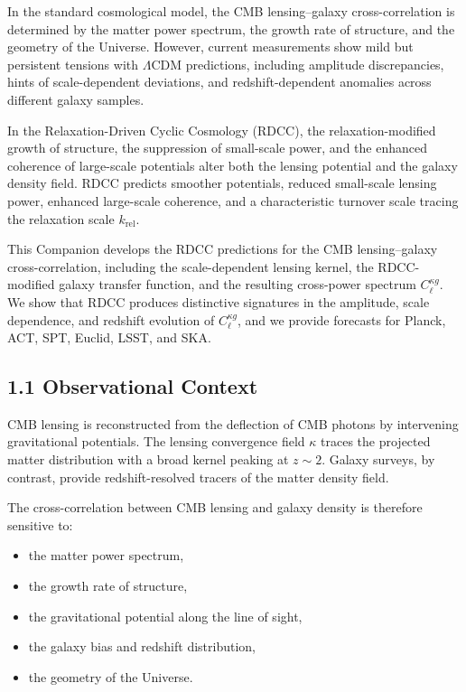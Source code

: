 \documentclass[11pt,a4paper]{article}
\begin{document}
In the standard cosmological model, the CMB lensing–galaxy cross-correlation is determined 
by the matter power spectrum, the growth rate of structure, and the geometry of the Universe. 
However, current measurements show mild but persistent tensions with $\Lambda$CDM 
predictions, including amplitude discrepancies, hints of scale-dependent deviations, and 
redshift-dependent anomalies across different galaxy samples.

In the Relaxation-Driven Cyclic Cosmology (RDCC), the relaxation-modified growth of 
structure, the suppression of small-scale power, and the enhanced coherence of large-scale 
potentials alter both the lensing potential and the galaxy density field. RDCC predicts 
smoother potentials, reduced small-scale lensing power, enhanced large-scale coherence, and 
a characteristic turnover scale tracing the relaxation scale $k_{\mathrm{rel}}$.

This Companion develops the RDCC predictions for the CMB lensing–galaxy cross-correlation, 
including the scale-dependent lensing kernel, the RDCC-modified galaxy transfer function, 
and the resulting cross-power spectrum $C_{\ell}^{\kappa g}$. We show that RDCC produces 
distinctive signatures in the amplitude, scale dependence, and redshift evolution of 
$C_{\ell}^{\kappa g}$, and we provide forecasts for Planck, ACT, SPT, Euclid, LSST, and SKA.

\subsection*{1.1 Observational Context}

CMB lensing is reconstructed from the deflection of CMB photons by intervening gravitational 
potentials. The lensing convergence field $\kappa$ traces the projected matter distribution 
with a broad kernel peaking at $z \sim 2$. Galaxy surveys, by contrast, provide 
redshift-resolved tracers of the matter density field.

The cross-correlation between CMB lensing and galaxy density is therefore sensitive to:

\begin{itemize}
    \item the matter power spectrum,
    \item the growth rate of structure,
    \item the gravitational potential along the line of sight,
    \item the galaxy bias and redshift distribution,
    \item the geometry of the Universe.
\end{itemize}
\end{document}
